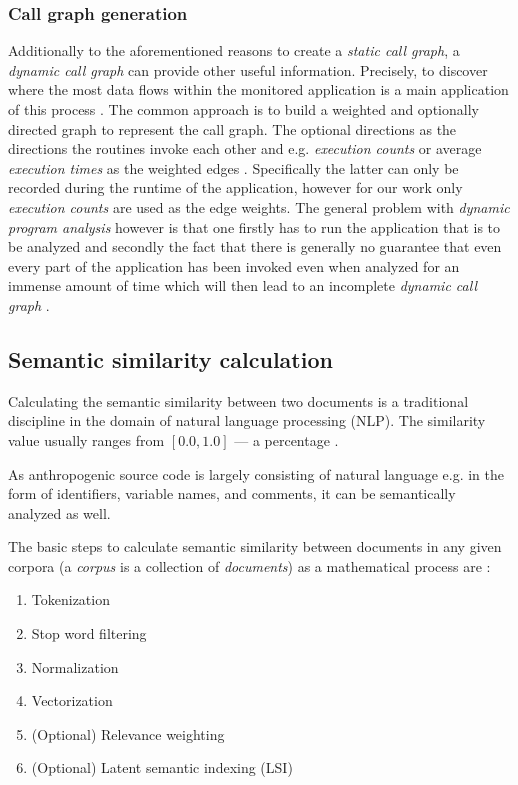 \documentclass[12pt,a4paper]{report}
\begin{document}
\subsubsection{Call graph generation} \label{subsubsect:call-graph-dynamic}
Additionally to the aforementioned reasons to create a \textit{static call graph},
a \textit{dynamic call graph} can provide other useful information.
Precisely, to discover where the most data flows within the monitored application
is a main application of this process \cite{graham1982gprof}.
The common approach is to build a weighted and optionally directed graph
to represent the call graph. The optional directions as the directions the
routines invoke each other and e.g. \textit{execution counts} or average
\textit{execution times} as the weighted edges \cite{graham1982gprof}.
Specifically the latter can only be recorded during the runtime of the application,
however for our work only \textit{execution counts} are used as the edge weights.
The general problem with \textit{dynamic program analysis} however is that one
firstly has to run the application that is to be analyzed and secondly the fact
that there is generally no guarantee that even every part of the application
has been invoked even when analyzed for an immense amount of time which will
then lead to an incomplete \textit{dynamic call graph} \cite{graham1982gprof}.


\subsection{Semantic similarity calculation} \label{subsect:semantic-similarity}

Calculating the semantic similarity between two documents is a traditional
discipline in the domain of natural language processing (NLP).
The similarity value usually ranges from \([0.0, 1.0]\) ---
a percentage \cite{singhal2001ir}.

As anthropogenic source code is largely consisting of natural language
e.g. in the form of identifiers, variable names, and comments, it can be
semantically analyzed as well.

The basic steps to calculate semantic similarity between documents in
any given corpora (a \textit{corpus} is a collection of \textit{documents})
as a mathematical process are \cite{singhal2001ir}:
\begin{enumerate}
  \item Tokenization
  \item Stop word filtering
  \item Normalization
  \item Vectorization
  \item (Optional) Relevance weighting
  \item (Optional) Latent semantic indexing (LSI)
\end{enumerate}
\end{document}
